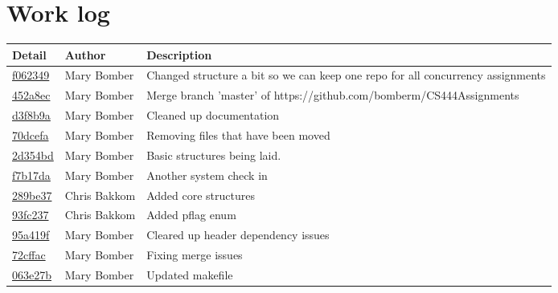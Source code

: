 \documentclass[letterpaper,10pt,titlepage]{article}
\begin{document}
\section{Work log}
\begin{tabular}{l l l}\textbf{Detail} & \textbf{Author} & \textbf{Description}\\\hline
	\href{https://github.com/bomberm/CS444Assignments/commit/f06234991cc84d48aba38faac50b9970d0f2c6fa}{f062349} & Mary Bomber & Changed structure a bit so we can keep one repo for all concurrency assignments\\\hline
	\href{https://github.com/bomberm/CS444Assignments/commit/452a8ecd02d1a46e8414b41ec0e320f344af323c}{452a8ec} & Mary Bomber & Merge branch 'master' of https://github.com/bomberm/CS444Assignments\\\hline
	\href{https://github.com/bomberm/CS444Assignments/commit/d3f8b9a0263c9aa1ae076897900e3b007d0cd165}{d3f8b9a} & Mary Bomber & Cleaned up documentation\\\hline
	\href{https://github.com/bomberm/CS444Assignments/commit/70dcefab72ecdb83be8b0b4bf0ba7e5b41ca4bfc}{70dcefa} & Mary Bomber & Removing files that have been moved\\\hline
	\href{https://github.com/bomberm/CS444Assignments/commit/2d354bd09e3a57390710cf0f9a558450fe0c1e62}{2d354bd} & Mary Bomber & Basic structures being laid.\\\hline
	\href{https://github.com/bomberm/CS444Assignments/commit/f7b17da1056e16bfae0336d1fadc9bbc09f4a99d}{f7b17da} & Mary Bomber & Another system check in\\\hline
	\href{https://github.com/bomberm/CS444Assignments/commit/289be37e3f16bf33d7f6f915aff00fa9678ce742}{289be37} & Chris Bakkom & Added core structures\\\hline
	\href{https://github.com/bomberm/CS444Assignments/commit/93fc237ea43a9067ad713578981c89bdf3ac63b2}{93fc237} & Chris Bakkom & Added pflag enum\\\hline
	\href{https://github.com/bomberm/CS444Assignments/commit/95a419fb5709987b890fd9addb2d8e2465a92259}{95a419f} & Mary Bomber & Cleared up header dependency issues\\\hline
	\href{https://github.com/bomberm/CS444Assignments/commit/72cffac75fc46ece61c49e97358aca383faf88a9}{72cffac} & Mary Bomber & Fixing merge issues\\\hline
	\href{https://github.com/bomberm/CS444Assignments/commit/063e27bc35d15f29cd24881ae02caaeab96605b0}{063e27b} & Mary Bomber & Updated makefile\\\hline

\end{tabular}
\end{document}
